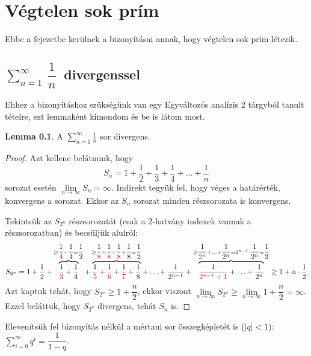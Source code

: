 \documentclass[12pt]{book}
\theoremstyle{plain} %
\theoremstyle{definition} %
\newtheorem{lem/}{Lemma}[section]
\newenvironment{lem}
  {\renewcommand{\qedsymbol}{$\clubsuit$}%
   \pushQED{\qed}\begin{lem/}}
  {\popQED\end{lem/}}
\theoremstyle{remark}
\renewcommand\qedsymbol{$\blacksquare$}
\numberwithin{equation}{section}  %
\begin{document}
	\chapter*{Végtelen  sok prím}
	\setcounter{chapter}{\thechapter+1}
	\setcounter{section}{0}
	Ebbe a fejezetbe kerülnek a bizonyításai annak, hogy végtelen sok prím létezik.
	
	\section{$\displaystyle\sum_{n=1}^{\infty} \ \dfrac{1}{n}\ $ divergenssel}
	
	Ehhez a bizonyításhoz szükségünk van egy Egyváltozós analízis 2 tárgyból tanult tételre, ezt lemmaként kimondom és be is látom most.
	
	\begin{lem}\label{egypern}
		A $\sum\limits_{n=1}^{\infty} \frac{1}{n}$ sor divergens.
	\end{lem}

	\begin{proof}
		Azt kellene belátnunk, hogy
		\[ S_n = 1 + \dfrac{1}{2} + \dfrac{1}{3} + \dfrac{1}{4} + \ldots + \dfrac{1}{n} \]
		sorozat esetén $\lim\limits_{n\to \infty} S_n = \infty$. Indirekt tegyük fel, hogy véges a határérték, konvergens a sorozat. Ekkor az $S_n$ sorozat minden részsorozata is konvergens.
		
		Tekintsük az $S_{2^n}$ részsorozatát (csak a $2$-hatvány indexek vannak a részsorozatban) és becsüljük alulról:
		\[ S_{2^n} = 1 + \dfrac{1}{2} + \overbrace{ \dfrac{1}{\color{red}3} +\dfrac{1}{4} }^{\geq \dfrac{1}{\color{red}4}+\dfrac{1}{4} = \dfrac{1}{2}} +\overbrace{ \dfrac{1}{\color{red}5}+\dfrac{1}{\color{red}6}+\dfrac{1}{\color{red}7}+\dfrac{1}{8}}^{\geq \dfrac{1}{\color{red}8}+\dfrac{1}{\color{red}8}+\dfrac{1}{\color{red}8}+\dfrac{1}{8} = \dfrac{1}{2}} +\ldots + \dfrac{1}{2^{n-1}} + \overbrace{ \dfrac{1}{\color{red}2^{n-1}+1} + \ldots + \dfrac{1}{2^n} }^{\geq \dfrac{1}{\color{red}2^n} + \ldots + \dfrac{1}{2^n} = 2^{n-1} \cdot \dfrac{1}{2^n} = \dfrac{1}{2}} \geq 1 + n\cdot \dfrac{1}{2} \]
		Azt kaptuk tehát, hogy $S_{2^n}\geq 1+\dfrac{n}{2}$, ekkor viszont $\lim\limits_{n\to \infty} S_{2^n} \geq \lim\limits_{n\to \infty} 1+\dfrac{n}{2} = \infty$. Ezzel beláttuk, hogy $S_{2^n}$ divergens, tehát $S_n$ is.
	\end{proof}

	Elevenítsük fel bizonyítás nélkül a mértani sor összegképletét is ($|q|<1$): $\sum\limits_{i=0}^{\infty} q^i = \dfrac{1}{1-q}$.
\end{document}
